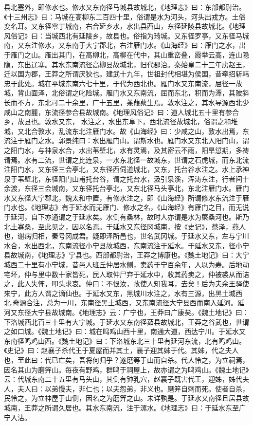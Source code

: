 \documentclass[12pt,UTF8]{ctexbook}
\begin{document}
县北塞外，即修水也。修水又东南径马城县故城北，《地理志》曰：东部都尉治。《十三州志》曰：马城在高柳东二百四十里，俗谓是水为河头，河头出戎方。土俗变名耳。又东径零丁城南，右合延乡水，水出县西山，东径延陵县故城北。《地理风俗记》曰：当城西北有延陵乡，故县也。俗指为琦城。又东径罗亭，又东径马城南，又东注修水，又东南于大宁郡北，右注雁门水。《山海经》曰：雁门之水，出于雁门之山。雁出其门，在高柳北，高柳在代中，其山重峦叠，霞举云高，连山隐隐，东出辽塞。其水东南流径高柳县故城北，旧代郡治。秦始皇二十三年虏赵王，迁以国为郡，王莽之所谓厌狄也。建武十九年，世祖封代相堪为侯国，昔牵招斩韩忠于此处。城在平城东南六七十里，于代为西北也。雁门水又东南流，屈径一故城，背山面泽，北俗谓之叱险城。雁门水又东南流，屈而东北，积而为潭，其陂斜长而不方，东北可二十余里，广十五里，蒹葭藂生焉。敦水注之，其水导源西北少咸山之南麓，东流径参合县故城南。《地理风俗记》曰：道人城北五十里有参合乡，故县也。敦水又东， 水注之，水出东阜下，西北流径故城北，俗谓之和堆城，又北合敦水，乱流东北注雁门水。故《山海经》曰：少咸之山，敦水出焉，东流注于雁门之水。郭景纯曰：水出雁门山。谓斯水也。雁门水又东北入阳门山，谓之阳门水，与神泉水合，水出苇壁北，水有灵焉，及其密云不雨，阳旱愆期，多祷请焉。水有二流，世谓之比连泉，一水东北径一故城东，世谓之石虎城，而东北流注阳门水，又东径三会亭北，又东径西伺道城北，又东，托台谷水注之。水上承神泉于苇壁北，东径阳门山甫托台谷，谓之托台水，汲引泉溪，浑涛东注，行者间十余渡，东径三会城南，又东径托台亭北，又东北径马头亭北，东北注雁门水。雁门水又东径大宁郡北，魏太和中置，有修水注之，即《山海经》所谓修水东流注于雁门水也。《地理志》有于延水而无雁门、修水之名，《山海经》有雁门之目，而无说于延河，自下亦通谓之于延水矣。水侧有桑林，故时人亦谓是水为藂桑河也。斯乃北土寡桑，至此见之，因以名焉。于延水又东径冈城南，按《史记》，蔡泽，燕人也，谢病归相，秦号冈成君。疑即泽所邑也，世名武冈城。于延水又东，左与宁川水合，水出西北，东南流径小宁县故城西，东南流注于延水。于延水又东，径小宁县故城南，《地理志》宁县也。西部都尉治，王莽之博康也。《魏土地记》曰：大宁城西二十里有小宁城，昔邑人班丘仲居水侧，卖药于宁百余年，人以为寿。后地动宅坏，仲与里中数十家皆死，民人取仲尸弃于延水中，收其药卖之，仲被裘从而诘之，此人失怖，叩头求哀。仲曰：不恨汝，故使人知我耳，去矣！后为夫余王驿使来宁，此方人谓之谪仙也。于延水又东，黑城川水注之，水有三源，出黑土城西北.奇源合注，总为一川，东南径黑土城西，又东南流径大宁县西而南入延河。延河又东径大宁县故城南。《地理志》云：广宁也，王莽曰广康矣。《魏土地记》曰：下洛城西北百三十里有大宁城。于延水又东南径茹县故城北，王莽之谷武也，世谓之如口城。《魏土地记》曰：城在鸣鸡山西十里，南通大道，西达宁川。于延水又东南径鸣鸡山西。《魏土地记》曰：下洛城东北三十里有延河东流，北有鸣鸡山。《史记》曰：赵襄子杀代王于夏屋而并其土，襄子迎其姊于代。其姊，代之夫人也，至此曰：代已亡矣，吾将何归乎？遂磨等于山而自杀。代人怜之，为立祠焉，因名其山为磨笄山。每夜有野鸡，群鸣于祠屋上，故亦谓之为鸣鸡山。《魏土地记》云：代城东南二十五里有马头山，其侧有钟乳穴，赵襄子既害代王，迎姊，姊代夫人，夫人曰：以弟慢夫，非仁也；以夫怨弟，非义也。磨笄自刺而死。使者自杀，民怜之，为立神屋于山侧，因名之为磨笄之山。未详孰是。于延水又南径且居县故城南，王莽之所谓久居也。其水东南流，注于漯水。《地理志》曰：于延水东至广宁入沽。
\end{document}
